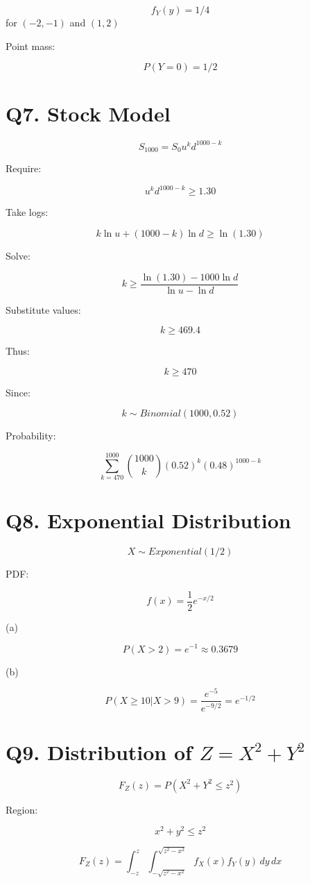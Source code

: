 \documentclass{article}
\begin{document}
\[
f_Y(y) = 1/4
\]
for $(-2,-1)$ and $(1,2)$

Point mass:

\[
P(Y=0) = 1/2
\]

\section*{Q7. Stock Model}

\[
S_{1000} = S_0 u^k d^{1000-k}
\]

Require:

\[
u^k d^{1000-k} \ge 1.30
\]

Take logs:

\[
k \ln u + (1000-k)\ln d \ge \ln(1.30)
\]

Solve:

\[
k \ge
\frac{\ln(1.30) - 1000\ln d}
{\ln u - \ln d}
\]

Substitute values:

\[
k \ge 469.4
\]

Thus:

\[
k \ge 470
\]

Since:

\[
k \sim Binomial(1000,0.52)
\]

Probability:

\[
\sum_{k=470}^{1000}
\binom{1000}{k}
(0.52)^k
(0.48)^{1000-k}
\]

\section*{Q8. Exponential Distribution}

\[
X \sim Exponential(1/2)
\]

PDF:

\[
f(x) = \frac{1}{2} e^{-x/2}
\]

(a)

\[
P(X>2) = e^{-1} \approx 0.3679
\]

(b)

\[
P(X \ge 10 | X>9)
=
\frac{e^{-5}}{e^{-9/2}}
=
e^{-1/2}
\]

\section*{Q9. Distribution of $Z = X^2 + Y^2$}

\[
F_Z(z) = P(X^2 + Y^2 \le z^2)
\]

Region:

\[
x^2 + y^2 \le z^2
\]

\[
F_Z(z)
=
\int_{-z}^{z}
\int_{-\sqrt{z^2-x^2}}^{\sqrt{z^2-x^2}}
f_X(x)f_Y(y)
\, dy \, dx
\]
\end{document}

